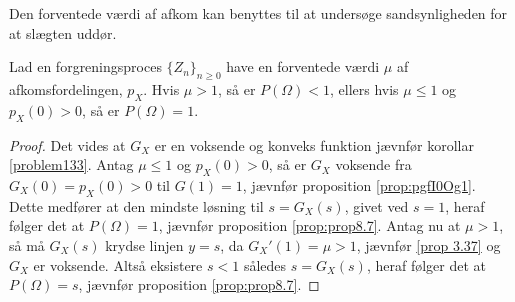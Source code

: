 Den forventede værdi af afkom kan benyttes til at undersøge sandsynligheden for at slægten uddør.
\begin{prop} \label{prop:prop8.9}%
  Lad en forgreningsproces $\{Z_{n}\}_{n \geq 0}$ have en forventede værdi $\mu$ af afkomsfordelingen, $p_{X}$. Hvis $\mu > 1$, så er $P(\Omega) < 1$, ellers hvis $\mu \leq 1$ og $p_{X}(0) > 0$, så er $P(\Omega) = 1$.
\end{prop}
\begin{proof}
  Det vides at $G_{X}$ er en voksende og konveks funktion jævnfør korollar \ref{problem133}.
  Antag $\mu \leq 1$ og $p_{X}(0) > 0$, så er $G_{X}$ voksende fra $G_{X}(0) = p_{X}(0) > 0$ til $G(1) = 1$, jævnfør proposition \ref{prop:pgfI0Og1}. Dette medfører at den mindste løsning til $s = G_{X}(s)$, givet ved $s = 1$, heraf følger det at $P(\Omega) = 1$, jævnfør proposition \ref{prop:prop8.7}.
  Antag nu at $\mu > 1$, så må $G_{X}(s)$ krydse linjen $y = s$, da $G_{X}'(1) = \mu > 1$, jævnfør \ref{prop 3.37} og $G_{X}$ er voksende. Altså eksistere $s < 1$ således $s = G_{X}(s)$, heraf følger det at $P(\Omega) = s$, jævnfør proposition \ref{prop:prop8.7}.
\end{proof}

